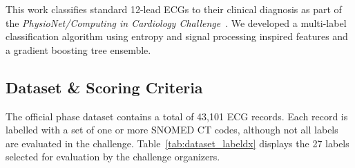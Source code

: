 \documentclass[twocolumn]{cinc}
\begin{document}
This work classifies standard 12-lead ECGs to their clinical diagnosis as part of the \emph{PhysioNet/Computing in Cardiology Challenge}~\cite{physionet_challenge_2020}.
We developed a multi-label classification algorithm using entropy and signal processing inspired features and a gradient boosting tree ensemble.

\subsection{Dataset \& Scoring Criteria}

The official phase dataset contains a total of 43,101 ECG records.
Each record is labelled with a set of one or more SNOMED CT codes, although not all labels are evaluated in the challenge.
Table~\ref{tab:dataset_labeldx} displays the 27 labels selected for evaluation by the challenge organizers.
\end{document}
